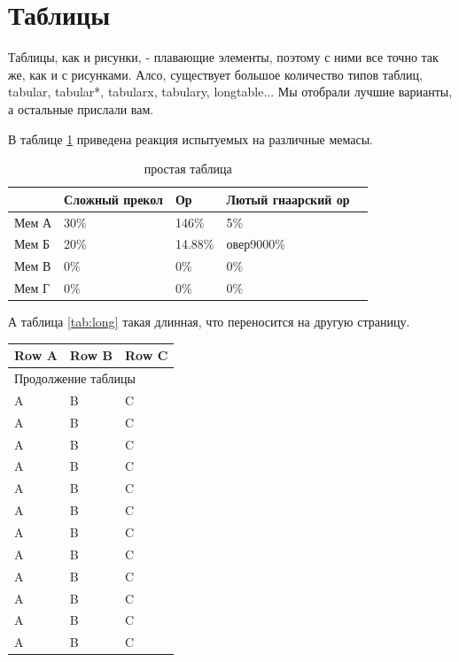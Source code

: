 \section{Таблицы}
\aftertitle

Таблицы, как и рисунки, - плавающие элементы, поэтому с ними все точно так же, как и с рисунками. Алсо, существует
большое количество типов таблиц, tabular, tabular*, tabularx, tabulary, longtable... Мы отобрали лучшие варианты, а
остальные прислали вам.

В таблице \ref{tab:memes} приведена реакция испытуемых на различные мемасы.
\begin{table}[h!]
	\caption{простая таблица}
	\label{tab:memes}
	\begin{tabularx}{\textwidth}{|l|X|X|X|X|}
		\hline
		        & Сложный прекол & Ор & Лютый гнаарский ор \\\hline
		Мем А   & 30\%           & 146\%      & 5\%        \\\hline
		Мем Б   & 20\%           & 14.88\%    & овер9000\% \\\hline
		Мем В   &  0\%           & 0\%        & 0\%        \\\hline
		Мем Г   &  0\%           & 0\%        & 0\%        \\\hline				
	\end{tabularx}
\end{table}

А таблица \ref{tab:long} такая длинная, что переносится на другую страницу. 

	\begin{tabularx}{\textwidth}{|X|X|X|}
		\caption{длинная таблица}\label{tab:long} \\
		\hline
		Row A & Row B & Row C\\
		\hline
		\hline
		\endfirsthead
			
		\multicolumn{3}{l}{Продолжение таблицы \thetable}\\
		\hline
		\endhead
		
		\endfoot
		
		\hline
		\endlastfoot
		
		A & B & C\\
		A & B & C\\
		A & B & C\\
		A & B & C\\
		A & B & C\\
		A & B & C\\
		A & B & C\\
		A & B & C\\
		A & B & C\\
		A & B & C\\
		A & B & C\\
		A & B & C\\
	\end{tabularx}

